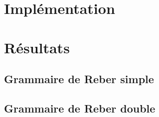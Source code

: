 \section{Implémentation}

\section{Résultats}
\subsection{Grammaire de Reber simple}
\subsection{Grammaire de Reber double}

